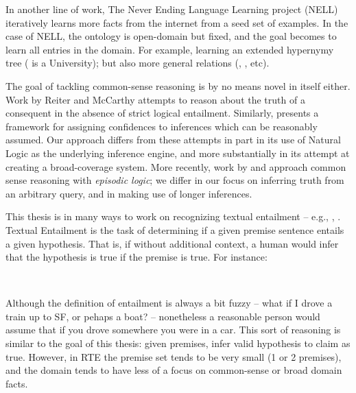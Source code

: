 In another line of work, The Never Ending Language Learning project (NELL) \cite{key:2010carlson-nell}
  iteratively learns more facts from the internet
  from a seed set of examples.
In the case of NELL, the ontology is open-domain but fixed, and the goal becomes to learn
  all entries in the domain.
For example, learning an extended hypernymy tree ( is a University);
  but also more general relations (, , etc).


%
%

The goal of tackling common-sense reasoning is by no means novel in
  itself either.
Work by Reiter and McCarthy \cite{key:1980reiter-logic,key:1980mccarthy-circumscription}
  attempts to reason about the truth of a consequent
  in the absence of strict logical entailment.
Similarly,  presents a framework for
  assigning confidences to inferences which can be reasonably assumed.
Our approach differs from these attempts in part in its use of Natural Logic
  as the underlying inference engine, and more substantially in its
  attempt at creating a broad-coverage system.
More recently, work by  and
   approach common sense reasoning
  with \textit{episodic logic}; we differ in our focus on inferring
  truth from an arbitrary query, and in making use of longer inferences.



%
%

This thesis is in many ways to work on 
  recognizing textual entailment -- e.g., 
  , .
Textual Entailment is the task of determining if a given premise sentence
  entails a given hypothesis.
That is, if without additional context, a human would infer that the hypothesis
  is true if the premise is true.
For instance:

\begin{displayquote}
   \\
\end{displayquote}

Although the definition of entailment is always a bit fuzzy -- what if I drove a train
  up to SF, or pehaps a boat? -- nonetheless a reasonable person would assume that if
  you drove somewhere you were in a car.
This sort of reasoning is similar to the goal of this thesis: given premises, infer
  valid hypothesis to claim as true.
However, in RTE the premise set tends to be very small (1 or 2 premises), and the domain
  tends to have less of a focus on common-sense or broad domain facts.



